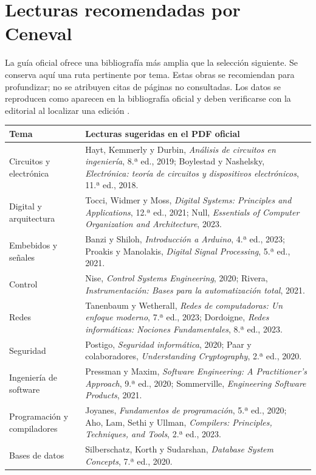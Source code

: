 \documentclass[11pt,letterpaper,oneside]{book}
\begin{document}
\chapter{Lecturas recomendadas por Ceneval}
La guía oficial ofrece una bibliografía más amplia que la selección siguiente. Se conserva aquí una ruta pertinente por tema. Estas obras se recomiendan para profundizar; no se atribuyen citas de páginas no consultadas. Los datos se reproducen como aparecen en la bibliografía oficial y deben verificarse con la editorial al localizar una edición \cite[págs. 15--17]{ceneval}.
\begin{longtable}{>{\raggedright\arraybackslash}p{}>{\raggedright\arraybackslash}p{}}
\toprule Tema & Lecturas sugeridas en el PDF oficial\\\midrule\endhead
Circuitos y electrónica & Hayt, Kemmerly y Durbin, \emph{Análisis de circuitos en ingeniería}, 8.ª ed., 2019; Boylestad y Nashelsky, \emph{Electrónica: teoría de circuitos y dispositivos electrónicos}, 11.ª ed., 2018.\\
Digital y arquitectura & Tocci, Widmer y Moss, \emph{Digital Systems: Principles and Applications}, 12.ª ed., 2021; Null, \emph{Essentials of Computer Organization and Architecture}, 2023.\\
Embebidos y señales & Banzi y Shiloh, \emph{Introducción a Arduino}, 4.ª ed., 2023; Proakis y Manolakis, \emph{Digital Signal Processing}, 5.ª ed., 2021.\\
Control & Nise, \emph{Control Systems Engineering}, 2020; Rivera, \emph{Instrumentación: Bases para la automatización total}, 2021.\\
Redes & Tanenbaum y Wetherall, \emph{Redes de computadoras: Un enfoque moderno}, 7.ª ed., 2023; Dordoigne, \emph{Redes informáticas: Nociones Fundamentales}, 8.ª ed., 2023.\\
Seguridad & Postigo, \emph{Seguridad informática}, 2020; Paar y colaboradores, \emph{Understanding Cryptography}, 2.ª ed., 2020.\\
Ingeniería de software & Pressman y Maxim, \emph{Software Engineering: A Practitioner's Approach}, 9.ª ed., 2020; Sommerville, \emph{Engineering Software Products}, 2021.\\
Programación y compiladores & Joyanes, \emph{Fundamentos de programación}, 5.ª ed., 2020; Aho, Lam, Sethi y Ullman, \emph{Compilers: Principles, Techniques, and Tools}, 2.ª ed., 2023.\\
Bases de datos & Silberschatz, Korth y Sudarshan, \emph{Database System Concepts}, 7.ª ed., 2020.\\
\bottomrule
\end{longtable}


\end{document}

